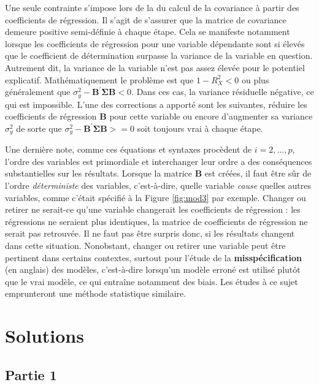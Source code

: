 \documentclass[
]{book}
\begin{document}
Une seule contrainte s'impose lors de la du calcul de la covariance à partir des coefficients de régression. Il s'agit de s'assurer que la matrice de covariance demeure positive semi-définie à chaque étape. Cela se manifeste notamment lorsque les coefficients de régression pour une variable dépendante sont si élevés que le coefficient de détermination surpasse la variance de la variable en question. Autrement dit, la variance de la variable n'est pas assez élevée pour le potentiel explicatif. Mathématiquement le problème est que \(1-R^2_X < 0\) ou plus généralement que \(\sigma^2_y-\mathbf{B^\prime\Sigma B}<0\). Dans ces cas, la variance résiduelle négative, ce qui est impossible. L'une des corrections a apporté sont les suivantes, réduire les coefficients de régression \(\mathbf{B}\) pour cette variable ou encore d'augmenter sa variance \(\sigma^2_y\) de sorte que \(\sigma^2_y-\mathbf{B^\prime\Sigma B}>=0\) soit toujours vrai à chaque étape.

Une dernière note, comme ces équations et syntaxes procèdent de \(i=2,...,p\), l'ordre des variables est primordiale et interchanger leur ordre a des conséquences substantielles sur les résultats. Lorsque la matrice \(\mathbf{B}\) est créées, il faut être sûr de l'ordre \emph{déterministe} des variables, c'est-à-dire, quelle variable \emph{cause} quelles autres variables, comme c'était spécifié à la Figure \ref{fig:mod3} par exemple. Changer ou retirer ne serait-ce qu'une variable changerait les coefficients de régression : les régressions ne seraient plus identiques, la matrice de coefficients de régression ne serait pas retrouvée. Il ne faut pas être surpris donc, si les résultats changent dans cette situation. Nonobstant, changer ou retirer une variable peut être pertinent dans certains contextes, surtout pour l'étude de la \textbf{misspécification} (en anglais) des modèles, c'est-à-dire lorsqu'un modèle erroné est utilisé plutôt que le vrai modèle, ce qui entraîne notamment des biais. Les études à ce sujet emprunteront une méthode statistique similaire.

\hypertarget{solutions}{%
\chapter*{Solutions}\label{solutions}}

\hypertarget{partie-1}{%
\section*{Partie 1}\label{partie-1}}
\end{document}
